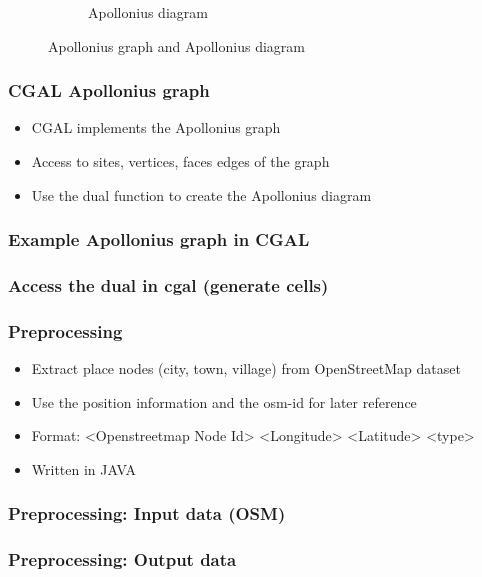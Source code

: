 \documentclass{beamer}
\begin{document}
\begin{frame}
\begin{figure}[htp]
\begin{subfigure}[b]{0.48\textwidth}
                    \caption{Apollonius diagram}
                    \label{fig:apo-diagram}
            \end{subfigure}
            \caption{Apollonius graph and Apollonius diagram}\label{fig:apollonius}
    \end{figure}
\end{frame}

\begin{frame}
    \frametitle{CGAL Apollonius graph}
    \begin{itemize}
        \item CGAL implements the Apollonius graph
        \item Access to sites, vertices, faces edges of the graph
        \item Use the dual function to create the Apollonius diagram
    \end{itemize}
\end{frame}

\begin{frame}
    \frametitle{Example Apollonius graph in CGAL}
    
\end{frame}

\begin{frame}
    \frametitle{Access the dual in cgal (generate cells)}
    
\end{frame}

\begin{frame}
    \frametitle{Preprocessing}
    \begin{itemize}
        \item Extract place nodes (city, town, village) from OpenStreetMap dataset 
        \item Use the position information and the osm-id for later reference
        \item Format: <Openstreetmap Node Id> <Longitude> <Latitude> <type>
        \item Written in JAVA
    \end{itemize}
\end{frame}

\begin{frame}
    \frametitle{Preprocessing: Input data (OSM)}
    
\end{frame}

\begin{frame}
    \frametitle{Preprocessing: Output data}
    
\end{frame}
\end{document}
